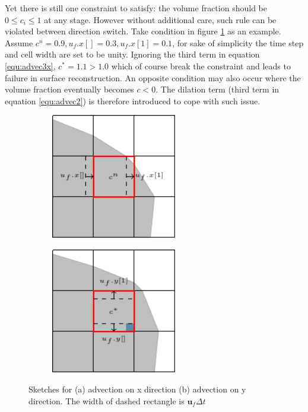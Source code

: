 Yet there is still one constraint to satisfy: the volume fraction should be $0\leq c_i \leq1$ at any stage. However without additional care, such rule can be violated between direction switch. Take condition in figure \ref{fig:VOFadvectionx} as an example. Assume $c^n=0.9,u_f.x[]=0.3,u_f.x[1]=0.1$, for sake of simplicity the time step and cell width are set to be unity. Ignoring the third term in equation \ref{equ:advec3x}, $c^\ast = 1.1 > 1.0$ which of course break the constraint and leads to failure in surface reconstruction. An opposite condition may also occur where the volume fraction eventually becomes $c<0$.
The dilation term (third term in equation \ref{equ:advec2}) is therefore introduced to cope with such issue\cite{2003_Scardovelli}.\par
\begin{figure}[!htbp]
    \centering
    \begin{subfigure}[b]{0.45\textwidth}
        \centering
        \includegraphics[height=5.5cm]{./image/vof-h/VOFadvectionx}
        \subcaption{}
        \label{fig:VOFadvectionx}
    \end{subfigure}
    \begin{subfigure}[b]{0.45\textwidth}
        \centering
        \includegraphics[height=5.5cm]{./image/vof-h/VOFadvectiony}
        \subcaption{}
        \label{fig:VOFadvectiony}
    \end{subfigure}
    \caption{Sketches for (a) advection on x direction (b) advection on y direction. The width of dashed rectangle is $\mathbf{u}_f\Delta t$}
    \label{fig:VOFadvection}
\end{figure}

